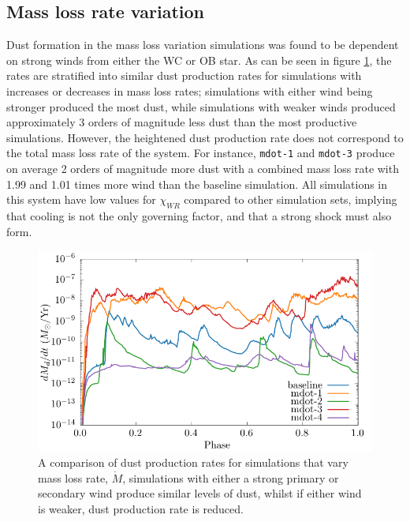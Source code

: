 \documentclass[fleqn,usenatbib]{mnras}
\begin{document}
\subsection{Mass loss rate variation}

Dust formation in the mass loss variation simulations was found to be dependent on strong winds from either the WC or OB star.
As can be seen in figure \ref{fig:mdotdustproductionrate}, the rates are stratified into similar dust production rates for simulations with increases or decreases in mass loss rates; simulations with either wind being stronger produced the most dust, while simulations with weaker winds produced approximately 3 orders of magnitude less dust than the most productive simulations.
However, the heightened dust production rate does not correspond to the total mass loss rate of the system.
For instance, \texttt{mdot-1} and \texttt{mdot-3} produce on average 2 orders of magnitude more dust with a combined mass loss rate with 1.99 and 1.01 times more wind than the baseline simulation.
All simulations in this system have low values for $\chi_{WR}$ compared to other simulation sets, implying that cooling is not the only governing factor, and that a strong shock must also form.

\begin{figure}
  \centering
  \includegraphics[width=\linewidth]{assets/mass-loss-phase-dust_rate.pdf}
  \caption[Dust production rate for simulations varying mass loss rate]{A comparison of dust production rates for simulations that vary mass loss rate, $\dot M$, simulations with either a strong primary or secondary wind produce similar levels of dust, whilst if either wind is weaker, dust production rate is reduced.}
  \label{fig:mdotdustproductionrate}
\end{figure}
\end{document}
